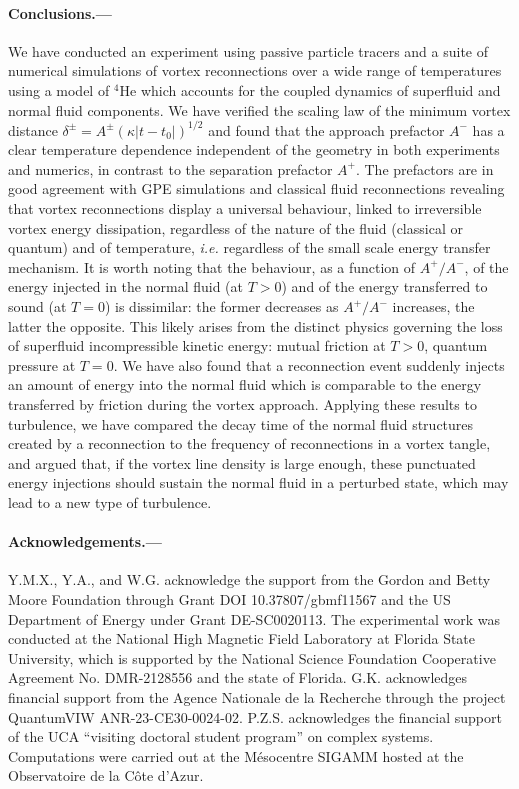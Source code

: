 \documentclass[%
 reprint,
unsortedaddress,
 amsmath,amssymb,
 aps,
 prl,
]{revtex4-2}
\begin{document}
\paragraph*{Conclusions.---} We have conducted an experiment using passive particle tracers and a suite of numerical simulations of vortex reconnections over a wide range of temperatures using a model of $^4$He which accounts for the coupled dynamics of superfluid and normal fluid components.
We have verified the scaling law of the minimum vortex distance 
$\delta^{\pm}=A^{\pm} (\kappa |t-t_0|)^{1/2}$ and found that the approach prefactor $A^-$ has a clear temperature dependence independent of the geometry in both experiments and numerics, in contrast to the
separation prefactor $A^+$. The prefactors are in good agreement
with GPE simulations \cite{villoisIrreversibleDynamicsVortex2020,allen2014} 
and classical fluid reconnections \cite{yaoSeparationScalingViscous2020}
revealing that vortex reconnections display a universal behaviour, linked to irreversible vortex energy dissipation, regardless of the nature
of the fluid (classical or quantum) and of temperature, \textit{i.e.} regardless of the small scale energy transfer mechanism. 
It is worth noting that the behaviour, as a function of $A^+/A^-$, of 
the energy injected in the normal fluid (at $T>0$) and of the energy transferred to sound (at $T=0$)
\cite{villoisIrreversibleDynamicsVortex2020,leadbeaterSoundEmissionDue2001b} is dissimilar: the former decreases as $A^+/A^-$
increases, the latter the opposite. This likely arises from the distinct physics governing the loss of superfluid 
incompressible kinetic energy: mutual friction at $T>0$, quantum pressure at $T=0$.
We have also found that a reconnection event suddenly injects an amount of energy 
into the normal fluid which is comparable to the energy transferred by friction
during the vortex approach. Applying these results to turbulence, we have
compared the decay time of the normal fluid structures created by a
reconnection to the frequency of reconnections in a vortex tangle, and argued
that, if the vortex line density is large enough, these punctuated
energy injections should sustain the normal fluid in a perturbed state, which may lead to a new type of turbulence.

\paragraph*{Acknowledgements.---} Y.M.X., Y.A., and W.G. acknowledge the support from the Gordon and Betty Moore Foundation through Grant DOI 10.37807/gbmf11567 and the US Department of Energy under Grant DE-SC0020113. The experimental work was conducted at the National High Magnetic Field Laboratory at Florida State University, which is supported by the National Science Foundation Cooperative Agreement No. DMR-2128556 and the state of Florida. G.K. acknowledges financial support from the Agence Nationale de la Recherche through the project QuantumVIW ANR-23-CE30-0024-02. P.Z.S. acknowledges the financial support of the UCA ``visiting doctoral student program'' on complex systems. Computations were carried out at the Mésocentre SIGAMM hosted at the Observatoire de la Côte d’Azur.
\end{document}
